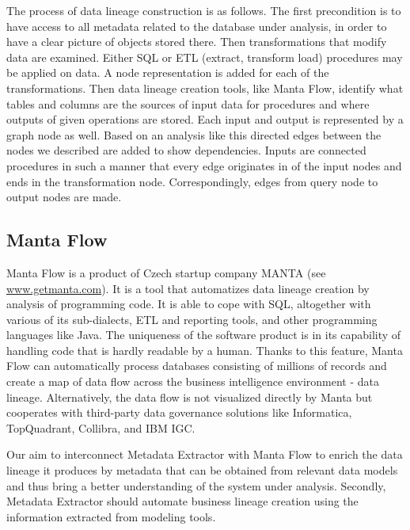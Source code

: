 The process of data lineage construction is as follows. The first precondition is to have access to all metadata related to the database under analysis, in order to have a clear picture of objects stored there. 
Then transformations that modify data are examined. 
Either SQL or ETL (extract, transform load) procedures may be applied on data.
A node representation is added for each of the transformations. 
Then data lineage creation tools, like Manta Flow, identify what tables and columns are the sources of input data for procedures and where outputs of given operations are stored. 
Each input and output is represented by a graph node as well. Based on an analysis like this directed edges between the nodes we described are added to show dependencies. Inputs are connected procedures in such a manner that every edge originates in of the input nodes and ends in the transformation node. Correspondingly, edges from query node to output nodes are made.


\subsection{Manta Flow}

Manta Flow is a product of Czech startup company MANTA (see \url{www.getmanta.com}). It is a tool that automatizes data lineage creation by analysis of programming code. It is able to cope with SQL, altogether with various of its sub-dialects, ETL and reporting tools, and other programming languages like Java. 
The uniqueness of the software product is in its capability of handling code that is hardly readable by a human. Thanks to this feature, Manta Flow can automatically process databases consisting of millions of records and create a map of data flow across the business intelligence environment - data lineage.
Alternatively, the data flow is not visualized directly by Manta but cooperates with third-party data governance solutions like Informatica, TopQuadrant, Collibra, and IBM IGC.

Our aim to interconnect Metadata Extractor with Manta Flow to enrich the data lineage it produces by metadata that can be obtained from relevant data models and thus bring a better understanding of the system under analysis. 
Secondly, Metadata Extractor should automate business lineage creation using the information extracted from modeling tools.


